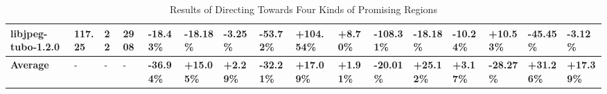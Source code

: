 \begin{table}[t]
\begin{adjustbox}{max width=\textwidth}
\begin{tabular}{|l|l|l|l|l|l|l|l|l|l|l|l|l|l|l|l|}
libjpeg-tubo-1.2.0   &  117.25      &   22     &   2908    &        -18.43\%         &      -18.18\%                  &      -3.25\%                 &       -53.72\%    &     +104.54\%       &         +8.70\%        &       -108.31\%                  &                       -18.18\% &         -10.24\%              &      +10.53\%                   &     -45.45\%                    &     -3.12\%                  \\ \hline
\textbf{Average}         &     -      &   -   &  -  &\textbf{-36.94\%} & \textbf{+15.05\%} & \textbf{+2.29\% }    & \textbf{-32.21\% }& \textbf{+17.09\%} & \textbf{+1.91\%} & \textbf{-20.01\%} & \textbf{+25.12\% }& \textbf{+3.17\%} & \textbf{-28.27\%} & \textbf{+31.26\%} & \textbf{+17.39\%}  \\\hline 
\end{tabular}
\end{adjustbox}
\caption{Results of Directing Towards Four Kinds of Promising Regions}
\label{TargetAreas}
\end{table}


